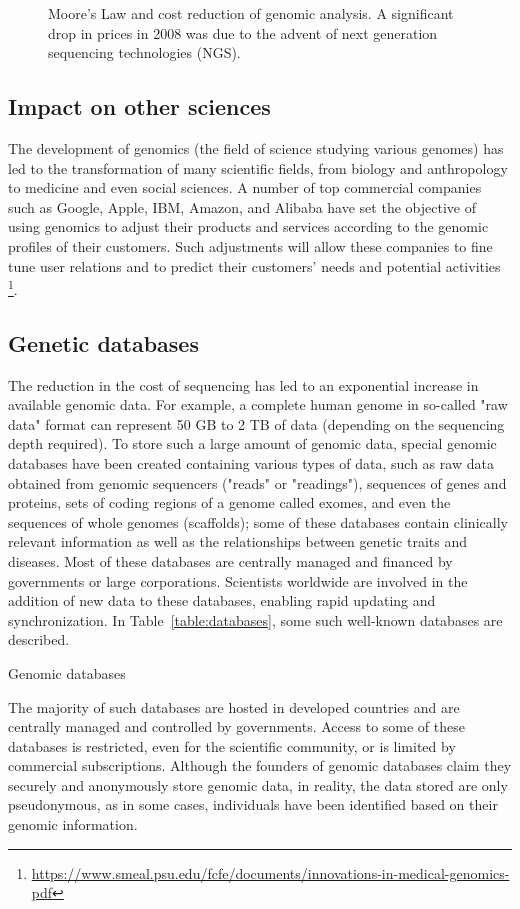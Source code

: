 \begin{figure}[h!] \centering
  
  \caption{Moore's Law and cost reduction of genomic analysis. A significant drop in prices in 2008 was due to the advent of next generation sequencing technologies (NGS)\cite{genome.gov:sequencingcostsdata}.}
  \label{fig:Moore}
\end{figure}


\subsection{Impact on other sciences}
The development of genomics (the field of science studying various genomes) has led to the transformation of many scientific fields, from biology and anthropology to medicine and even social sciences. A number of top commercial companies such as Google, Apple, IBM, Amazon, and Alibaba have set the objective of using genomics to adjust their products and services according to the genomic profiles of their customers. Such adjustments will allow these companies to fine tune user relations and to predict their customers’ needs and potential activities
\footnote{\url{https://www.smeal.psu.edu/fcfe/documents/innovations-in-medical-genomics-pdf}}.

\subsection{Genetic databases}
The reduction in the cost of sequencing has led to an exponential increase in available genomic data. For example, a complete human genome in so-called "raw data" format can represent 50 GB to 2 TB of data (depending on the sequencing depth required). To store such a large amount of genomic data, special genomic databases have been created containing various types of data, such as raw data obtained from genomic sequencers ("reads" or "readings"), sequences of genes and proteins, sets of coding regions of a genome called exomes, and even the sequences of whole genomes (scaffolds); some of these databases contain clinically relevant information as well as the relationships between genetic traits and diseases. Most of these databases are centrally managed and financed by governments or large corporations. Scientists worldwide are involved in the addition of new data to these databases, enabling rapid updating and synchronization. In Table~\ref{table:databases}, some such well-known databases are described.


\begin{table}[h!] \centering
  \caption{Genomic databases}
  \label{table:databases}
  
\end{table}

The majority of such databases are hosted in developed countries and are centrally managed and controlled by governments. Access to some of these databases is restricted, even for the scientific community, or is limited by commercial subscriptions. Although the founders of genomic databases claim they securely and anonymously store genomic data, in reality, the data stored are only pseudonymous, as in some cases, individuals have been identified based on their genomic information\cite{Gymrek321}.

